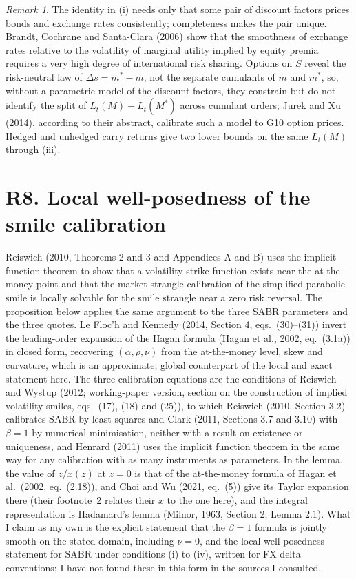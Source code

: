 \documentclass[11pt]{article}
\theoremstyle{remark}
\newtheorem{remark}[proposition]{Remark}
\begin{document}
\begin{remark}
The identity in (i) needs only that some pair of discount factors prices bonds and exchange rates consistently; completeness makes the pair unique. Brandt, Cochrane and Santa-Clara (2006) show that the smoothness of exchange rates relative to the volatility of marginal utility implied by equity premia requires a very high degree of international risk sharing. Options on $S$ reveal the risk-neutral law of $\Delta s=m^*-m$, not the separate cumulants of $m$ and $m^*$, so, without a parametric model of the discount factors, they constrain but do not identify the split of $L_t(M)-L_t(M^*)$ across cumulant orders; Jurek and Xu (2014), according to their abstract, calibrate such a model to G10 option prices. Hedged and unhedged carry returns give two lower bounds on the same $L_t(M)$ through (iii).
\end{remark}

\section*{R8. Local well-posedness of the smile calibration}

Reiswich (2010, Theorems 2 and 3 and Appendices A and B) uses the implicit function theorem to show that a volatility-strike function exists near the at-the-money point and that the market-strangle calibration of the simplified parabolic smile is locally solvable for the smile strangle near a zero risk reversal. The proposition below applies the same argument to the three SABR parameters and the three quotes. Le Floc'h and Kennedy (2014, Section 4, eqs.~(30)--(31)) invert the leading-order expansion of the Hagan formula (Hagan et al., 2002, eq.~(3.1a)) in closed form, recovering $(\alpha,\rho,\nu)$ from the at-the-money level, skew and curvature, which is an approximate, global counterpart of the local and exact statement here. The three calibration equations are the conditions of Reiswich and Wystup (2012; working-paper version, section on the construction of implied volatility smiles, eqs.~(17), (18) and (25)), to which Reiswich (2010, Section 3.2) calibrates SABR by least squares and Clark (2011, Sections 3.7 and 3.10) with $\beta=1$ by numerical minimisation, neither with a result on existence or uniqueness, and Henrard (2011) uses the implicit function theorem in the same way for any calibration with as many instruments as parameters. In the lemma, the value of $z/x(z)$ at $z=0$ is that of the at-the-money formula of Hagan et al.\ (2002, eq.~(2.18)), and Choi and Wu (2021, eq.~(5)) give its Taylor expansion there (their footnote~2 relates their $x$ to the one here), and the integral representation is Hadamard's lemma (Milnor, 1963, Section 2, Lemma 2.1). What I claim as my own is the explicit statement that the $\beta=1$ formula is jointly smooth on the stated domain, including $\nu=0$, and the local well-posedness statement for SABR under conditions (i) to (iv), written for FX delta conventions; I have not found these in this form in the sources I consulted.
\end{document}
